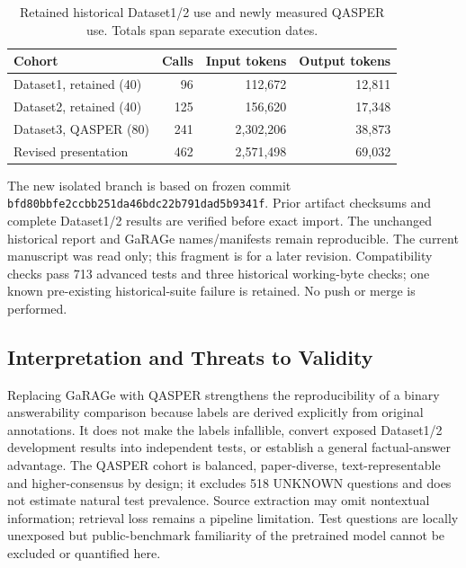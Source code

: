 \begin{table}[H]

\centering\small

\caption{Retained historical Dataset1/2 use and newly measured QASPER use. Totals span separate execution dates.}

\label{orange-tab:bounded-cost}

\begin{tabular}{lrrr}

\toprule

Cohort & Calls & Input tokens & Output tokens \\

\midrule

Dataset1, retained (40) & 96 & 112,672 & 12,811 \\

Dataset2, retained (40) & 125 & 156,620 & 17,348 \\

Dataset3, QASPER (80) & 241 & 2,302,206 & 38,873 \\

\midrule

Revised presentation & 462 & 2,571,498 & 69,032 \\

\bottomrule

\end{tabular}

\end{table}

The new isolated branch is based on frozen commit \texttt{bfd80bbfe2ccbb251da46bdc22b791dad5b9341f}. Prior artifact checksums and complete Dataset1/2 results are verified before exact import. The unchanged historical report and GaRAGe names/manifests remain reproducible. The current manuscript was read only; this fragment is for a later revision. Compatibility checks pass 713 advanced tests and three historical working-byte checks; one known pre-existing historical-suite failure is retained. No push or merge is performed.

\subsection{Interpretation and Threats to Validity}

Replacing GaRAGe with QASPER strengthens the reproducibility of a binary answerability comparison because labels are derived explicitly from original annotations. It does not make the labels infallible, convert exposed Dataset1/2 development results into independent tests, or establish a general factual-answer advantage. The QASPER cohort is balanced, paper-diverse, text-representable and higher-consensus by design; it excludes 518 UNKNOWN questions and does not estimate natural test prevalence. Source extraction may omit nontextual information; retrieval loss remains a pipeline limitation. Test questions are locally unexposed but public-benchmark familiarity of the pretrained model cannot be excluded or quantified here.

